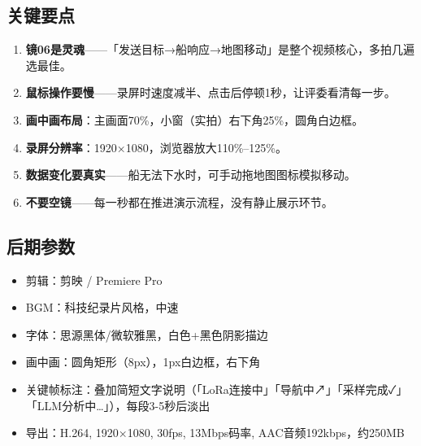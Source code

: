\documentclass[12pt,a4paper]{article}
\begin{document}
\subsection*{关键要点}

\begin{enumerate}[leftmargin=*,itemsep=6pt]
  \item \textbf{镜06是灵魂}——「发送目标→船响应→地图移动」是整个视频核心，多拍几遍选最佳。
  \item \textbf{鼠标操作要慢}——录屏时速度减半、点击后停顿1秒，让评委看清每一步。
  \item \textbf{画中画布局}：主画面70\%，小窗（实拍）右下角25\%，圆角白边框。
  \item \textbf{录屏分辨率}：1920×1080，浏览器放大110\%--125\%。
  \item \textbf{数据变化要真实}——船无法下水时，可手动拖地图图标模拟移动。
  \item \textbf{不要空镜}——每一秒都在推进演示流程，没有静止展示环节。
\end{enumerate}

\subsection*{后期参数}

\begin{itemize}[leftmargin=*,itemsep=3pt]
  \item 剪辑：剪映 / Premiere Pro
  \item BGM：科技纪录片风格，中速
  \item 字体：思源黑体/微软雅黑，白色+黑色阴影描边
  \item 画中画：圆角矩形（8px），1px白边框，右下角
  \item 关键帧标注：叠加简短文字说明（「LoRa连接中」「导航中↗」「采样完成✓」「LLM分析中…」），每段3-5秒后淡出
  \item 导出：H.264, 1920×1080, 30fps, 13Mbps码率, AAC音频192kbps，约250MB
\end{itemize}
\end{document}
